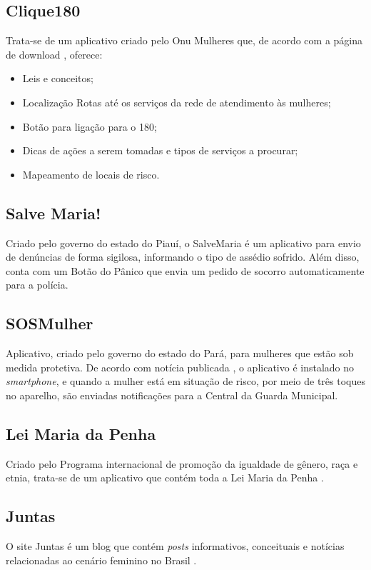 \vfill

\subsection*{Clique180}
Trata-se de um aplicativo criado pelo Onu Mulheres que, de acordo com
a página de download \cite{clique_180}, oferece:

\begin{itemize}
	\item Leis e conceitos;
	\item Localização Rotas até os serviços da rede de atendimento às mulheres;
	\item Botão para ligação para o 180;
	\item Dicas de ações a serem tomadas e tipos de serviços a procurar; 
	\item Mapeamento de locais de risco.
\end{itemize}

\subsection*{Salve Maria!}
Criado pelo governo do estado do Piauí, o SalveMaria \cite{salvemaria} é um aplicativo para envio de denúncias
de forma sigilosa, informando o tipo de assédio sofrido.
Além disso, conta com um Botão do Pânico que envia um pedido de socorro automaticamente para a polícia.

\subsection*{SOSMulher}
Aplicativo, criado pelo governo do estado do Pará, para mulheres que estão sob medida protetiva. 
De acordo com notícia publicada \cite{sosmulher}, 
o aplicativo é instalado no \textit{smartphone}, e quando a mulher está em situação de risco, por meio de três toques no aparelho, são enviadas notificações para a Central da Guarda Municipal.

\subsection*{Lei Maria da Penha}
Criado pelo Programa internacional de promoção da igualdade de gênero, raça e etnia, trata-se de um
aplicativo que contém toda a Lei Maria da Penha \cite{leimariadapenha}.

\subsection*{Juntas}
O site Juntas é um blog que contém \textit{posts} informativos, conceituais e notícias 
relacionadas ao cenário feminino no Brasil \cite{juntas}.

